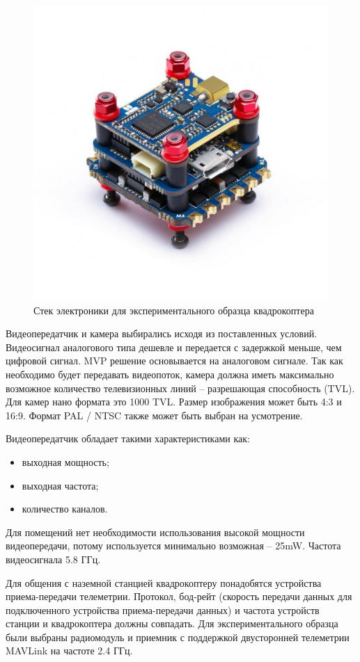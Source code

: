 \begin{figure}[H]
	\centering
	\includegraphics[width=0.5\linewidth]{../RW/pics/stack}
	\caption{Стек электроники для экспериментального образца квадрокоптера
	}
	\label{fig:stack} %
\end{figure}

Видеопередатчик и камера выбирались исходя из поставленных условий. Видеосигнал аналогового типа дешевле и передается с задержкой меньше, чем цифровой сигнал. MVP решение основывается на аналоговом сигнале. Так как необходимо будет передавать видеопоток, камера должна иметь максимально возможное количество телевизионных линий -- разрешающая способность (TVL). Для камер нано формата это 1000 TVL. Размер изображения может быть 4:3 и 16:9. Формат PAL / NTSC также может быть выбран на усмотрение.

Видеопередатчик обладает такими характеристиками как:
\begin{itemize}
	\item выходная мощность;
	\item выходная частота;
	\item количество каналов.
\end{itemize}

Для помещений нет необходимости использования высокой мощности видеопередачи, потому используется минимально возможная -- 25mW. Частота видеосигнала 5.8 ГГц.

Для общения с наземной станцией квадрокоптеру понадобятся устройства приема-передачи телеметрии. Протокол, бод-рейт (скорость передачи данных для подключенного устройства приема-передачи данных) и частота устройств станции и квадрокоптера должны совпадать. Для экспериментального образца были выбраны радиомодуль и приемник с поддержкой двусторонней телеметрии MAVLink на частоте 2.4 ГГц.

